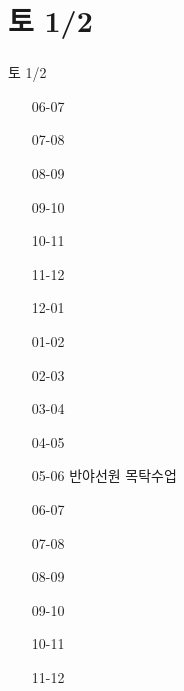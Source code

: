 \documentclass[aspectratio=1610,20pt,xcolor=pdftex,dvipsnames,table,handout]{beamer}
\begin{document}
	\section{토 1/2}											
	\begin{frame} [t,plain]											
	\frametitle{}											
		\begin{block} {토 1/2}										
		\setlength{\leftmargini}{3em}										
		\begin{itemize}										
			\item [06-07] \hrulefill									
			\item [07-08] \hrulefill									
			\item [08-09] \hrulefill									
			\item [09-10] \hrulefill									
			\item [10-11] \hrulefill									
			\item [11-12] \hrulefill									
			\item [12-01] \hrulefill									
			\item [01-02] \hrulefill									
			\item [02-03] \hrulefill									
			\item [03-04] \hrulefill									
			\item [04-05] \hrulefill									
			\item [05-06] \hrulefill			반야선원 목탁수업						
			\item [06-07] \hrulefill									
			\item [07-08] \hrulefill									
			\item [08-09] \hrulefill									
			\item [09-10] \hrulefill									
			\item [10-11] \hrulefill									
			\item [11-12] \hrulefill									
		\end{itemize}										
		\end{block}										
	\end{frame}											
												
\end{document}
